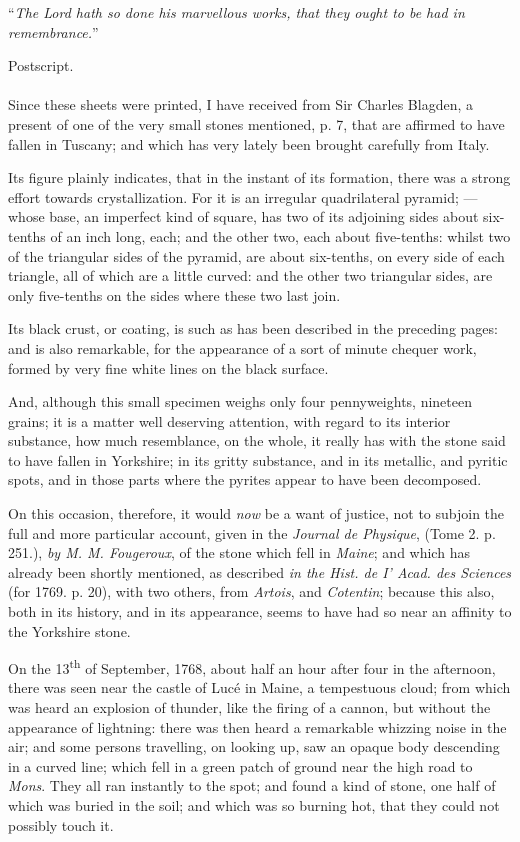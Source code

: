 \documentclass[a4paper, 12pt, oneside]{article}
\begin{document}
``\emph{The Lord hath so done his marvellous works, that they ought to be had in remembrance.}''
\clearpage
\begin{center}
Postscript.
\end{center}
\paragraph{}
Since these sheets were printed, I have received from Sir Charles Blagden, a present of one of the very small stones mentioned, p. 7, that are affirmed to have fallen in Tuscany; and which has very lately been brought carefully from Italy.

Its figure plainly indicates, that in the instant of its formation, there was a strong effort towards crystallization. For it is an irregular quadrilateral pyramid; --- whose base, an imperfect kind of square, has two of its adjoining sides about six-tenths of an inch long, each; and the other two, each about five-tenths: whilst two of the triangular sides of the pyramid, are about six-tenths, on every side of each triangle, all of which are a little curved: and the other two triangular sides, are only five-tenths on the sides where these two last join.

Its black crust, or coating, is such as has been described in the preceding pages: and is also remarkable, for the appearance of a sort of minute chequer work, formed by very fine white lines on the black surface.

And, although this small specimen weighs only four pennyweights, nineteen grains; it is a matter well deserving attention, with regard to its interior substance, how much resemblance, on the whole, it really has with the stone said to have fallen in Yorkshire; in its gritty substance, and in its metallic, and pyritic spots, and in those parts where the pyrites appear to have been decomposed.

On this occasion, therefore, it would \emph{now} be a want of justice, not to subjoin the full and more particular account, given in the \emph{Journal de Physique}, (Tome 2. p. 251.), \emph{by M. M. Fougeroux}, of the stone which fell in \emph{Maine}; and which has already been shortly mentioned, as described \emph{in the Hist. de I' Acad. des Sciences} (for 1769. p. 20), with two others, from \emph{Artois}, and \emph{Cotentin}; because this also, both in its history, and in its appearance, seems to have had so near an affinity to the Yorkshire stone.

On the 13\textsuperscript{th} of September, 1768, about half an hour after four in the afternoon, there was seen near the castle of Lucé in Maine, a tempestuous cloud; from which was heard an explosion of thunder, like the firing of a cannon, but without the appearance of lightning: there was then heard a remarkable whizzing noise in the air; and some persons travelling, on looking up, saw an opaque body descending in a curved line; which fell in a green patch of ground near the high road to \emph{Mons}. They all ran instantly to the spot; and found a kind of stone, one half of which was buried in the soil; and which was so burning hot, that they could not possibly touch it.
\end{document}
